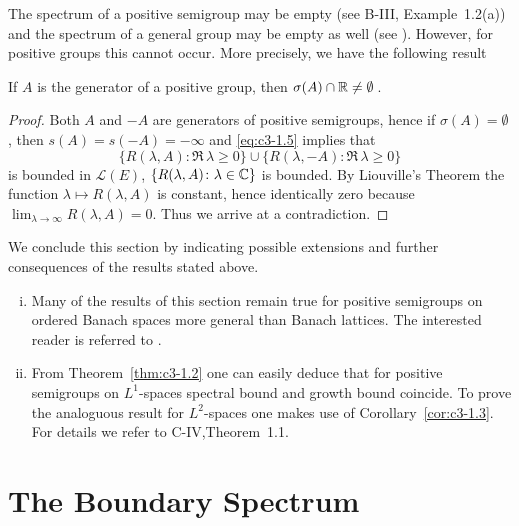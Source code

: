 The spectrum of a positive semigroup may be empty (see B-III, Example~1.2(a)) and the spectrum of a general group may be empty as well (see \citet[Section~23.16]{hillephillips:1957}).
However, for positive groups this cannot occur.
More precisely, we have the following result
\begin{corollary}\label{cor:c3-1.6}
If $A$ is the generator of a positive group, then $\sigma(A)\cap\mathbb{R}  \neq \emptyset$\,.
\end{corollary}

\begin{proof}
Both $A$ and $-A$ are generators of positive semigroups, hence if $\sigma(A) = \emptyset$, then $s(A) = s(-A) = -\infty$ and \eqref{eq:c3-1.5} implies that 
\[
\{R(\lambda,A) \colon \Re\, \lambda \geq 0\} \cup \{R(\lambda,-A) \colon \Re\, \lambda \geq 0\}
\]
is bounded in $\mathcal{L}(E)$, \ie  $\{R(\lambda,A) \colon \lambda \in \mathbb{C} \}$ is bounded.
By Liouville's Theorem the function $\lambda \mapsto R(\lambda,A)$ is constant, hence identically zero because $\lim_{\lambda\to\infty}R(\lambda,A) = 0$.
Thus we arrive at a contradiction.
\end{proof}

We conclude this section by indicating possible extensions and further consequences of the results stated above.

\begin{remarks}\label{rem:c3-1.7}
\begin{enumerate}[(i), wide]
	\item 
	Many of the results of this section remain true for positive semigroups on ordered Banach spaces more general than Banach lattices.
	The interested reader is referred to \citet{greinervoigtwolff:1981}.
	
	\item 
	From Theorem~\ref{thm:c3-1.2} one can easily deduce that for positive semigroups on $L^1$-spaces spectral bound and growth bound coincide.
	To prove the analoguous result for $L^2$-spaces one makes use of Corollary~\ref{cor:c3-1.3}.
	For details we refer to C-IV,Theorem~1.1.
\end{enumerate}
\end{remarks}
%
\section{The Boundary Spectrum}\label{sec:c3-2}

